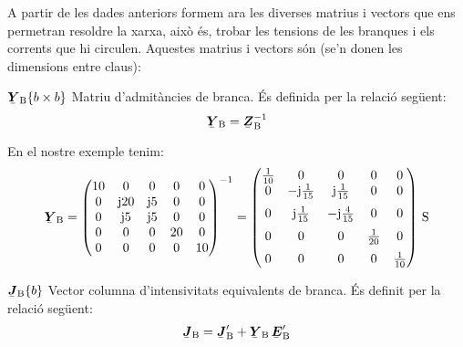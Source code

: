 A partir de les dades anteriors formem ara les diverses matrius i
vectors que ens permetran resoldre la xarxa, això és, trobar les
tensions de les branques i els corrents que hi circulen. Aquestes
matrius i vectors són (se'n donen les dimensions entre claus):

\begin{list}{}
{\setlength{\labelwidth}{20mm} \setlength{\leftmargin}{22mm} \setlength{\labelsep}{2mm}}
   \item[$\mcmplx{Y}\ped{B}\{b\times b\}$] Matriu d'admitàncies de branca. És definida per la relació següent:
   \begin{equation}
      \mcmplx{Y}\ped{B} = \mcmplx{Z}\ped{B}^{-1}
   \end{equation}

   En el nostre exemple tenim:
   \[
      \mcmplx{Y}\ped{B} = \begin{pmatrix}
            10 & 0 & 0 & 0 & 0 \\
            0 & \ju 20 & \ju 5 & 0 & 0 \\
            0 & \ju 5 & \ju 5 & 0 & 0 \\
            0 & 0 & 0 & 20 & 0 \\
            0 & 0 & 0 & 0 & 10
      \end{pmatrix} ^{-1} =
      \begin{pmatrix}
            \frac{1}{10} & 0 & 0 & 0 & 0 \\
            0 & -\ju\frac{1}{15} & \ju\frac{1}{15} & 0 & 0 \\[2mm]
            0 & \ju\frac{1}{15} & -\ju\frac{4}{15} & 0 & 0 \\[2mm]
            0 & 0 & 0 & \frac{1}{20} & 0 \\[2mm]
            0 & 0 & 0 & 0 & \frac{1}{10}
      \end{pmatrix}\si{\,S}
   \]

   \item[$\mcmplx{J}\ped{B}\{b\}$] Vector columna d'intensivitats equivalents de branca. És definit per la relació següent:
   \begin{equation}
      \mcmplx{J}\ped{B} = \mcmplx{J}'\ped{B}  + \mcmplx{Y}\ped{B} \,\mcmplx{E}'\ped{B}
   \end{equation}


\end{list}
